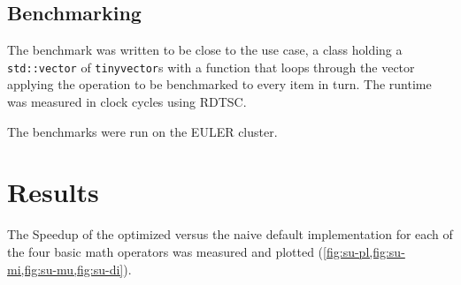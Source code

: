 \documentclass[a4paper]{scrartcl}
\begin{document}
\subsection*{Benchmarking}
The benchmark was written to be close to the use case, a class holding a \texttt{std::vector} of \texttt{tinyvector}s 
with a function that loops through the vector applying the operation to be benchmarked to every item in turn.
The runtime was measured in clock cycles using RDTSC.

The benchmarks were run on the EULER cluster.

\section*{Results}
The Speedup of the optimized versus the naive default implementation for each of the four basic math operators was measured and plotted (\cref{fig:su-pl,fig:su-mi,fig:su-mu,fig:su-di}).
\end{document}
